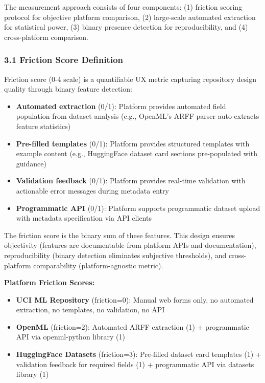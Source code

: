 
The measurement approach consists of four components: (1) friction scoring protocol for objective platform comparison, (2) large-scale automated extraction for statistical power, (3) binary presence detection for reproducibility, and (4) cross-platform comparison.

\subsubsection{3.1 Friction Score Definition}

Friction score (0-4 scale) is a quantifiable UX metric capturing repository design quality through binary feature detection:

\begin{itemize}
\item \textbf{Automated extraction} (0/1): Platform provides automated field population from dataset analysis (e.g., OpenML's ARFF parser auto-extracts feature statistics)
\item \textbf{Pre-filled templates} (0/1): Platform provides structured templates with example content (e.g., HuggingFace dataset card sections pre-populated with guidance)
\item \textbf{Validation feedback} (0/1): Platform provides real-time validation with actionable error messages during metadata entry
\item \textbf{Programmatic API} (0/1): Platform supports programmatic dataset upload with metadata specification via API clients
\end{itemize}

The friction score is the binary sum of these features. This design ensures objectivity (features are documentable from platform APIs and documentation), reproducibility (binary detection eliminates subjective thresholds), and cross-platform comparability (platform-agnostic metric).

\textbf{Platform Friction Scores:}
\begin{itemize}
\item \textbf{UCI ML Repository} (friction=0): Manual web forms only, no automated extraction, no templates, no validation, no API
\item \textbf{OpenML} (friction=2): Automated ARFF extraction (1) + programmatic API via openml-python library (1)
\item \textbf{HuggingFace Datasets} (friction=3): Pre-filled dataset card templates (1) + validation feedback for required fields (1) + programmatic API via datasets library (1)
\end{itemize}

